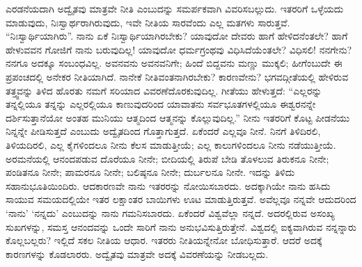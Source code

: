 ಎರಡನೆಯದಾಗಿ ಅದ್ವೈತವು ಮಾತ್ರವೇ ನೀತಿ ಎಂಬುದನ್ನು ಸಮರ್ಪಕವಾಗಿ ವಿವರಿಸಬಲ್ಲುದು. ಇತರರಿಗೆ ಒಳ್ಳೆಯದು ಮಾಡುವುದು, ನಿಃಸ್ವಾರ್ಥರಾಗಿರುವುದು, ಇವೇ ನೀತಿಯ ಸಾರವೆಂದು ಎಲ್ಲ ಮತಗಳು ಸಾರುತ್ತವೆ. “ನಿಃಸ್ವಾರ್ಥಿಯಾಗಿರು”. ನಾನು ಏಕೆ ನಿಃಸ್ವಾರ್ಥಿಯಾಗಿರಬೇಕು? ಯಾವುದೋ ದೇವರು ಹಾಗೆ ಹೇಳಿದನೆಂತಲೇ? ಹಾಗೆ ಹೇಳುವವನ ಗೋಜಿಗೆ ನಾನು ಬರುವುದಿಲ್ಲ! ಯಾವುದೋ ಧರ್ಮಗ್ರಂಥವು ವಿಧಿಸಿದೆಯೆಂತಲೇ? ವಿಧಿಸಲಿ! ನನಗೇನು? ನನಗೂ ಅದಕ್ಕೂ ಸಂಬಂಧವಿಲ್ಲ. ಅವನವನು ಅವನವನಿಗೇ; ಹಿಂದೆ ಬಿದ್ದವನು ಮಣ್ಣು ಮುಕ್ಕಲಿ; ಹೀಗೆಂಬುದೇ ಈ ಪ್ರಪಂಚದಲ್ಲಿ ಅನೇಕರ ನೀತಿಯಾಗಿದೆ. ನಾನೇಕೆ ನೀತಿವಂತನಾಗಿರಬೇಕು? ಕಾರಣವೇನು? ಭಗವದ್ಗೀತೆಯಲ್ಲಿ ಹೇಳಿರುವ ತತ್ತ್ವವನ್ನು ತಿಳಿದ ಹೊರತು ನಮಗೆ ಸರಿಯಾದ ವಿವರಣೆ\break ದೊರಕುವುದಿಲ್ಲ. ಗೀತೆಯು ಹೇಳುತ್ತದೆ: “ಎಲ್ಲರನ್ನು ತನ್ನಲ್ಲಿಯೂ ತನ್ನನ್ನು ಎಲ್ಲರಲ್ಲಿಯೂ ಕಾಣುವುದರಿಂದ ಯಾವಾತನು ಸರ್ವಭೂತಗಳಲ್ಲಿಯೂ ಈಶ್ವರನನ್ನೇ ದರ್ಶಿಸುತ್ತಾನೆಯೋ ಅಂತಹ ಮುನಿಯು ಆತ್ಮದಿಂದ ಆತ್ಮನನ್ನು ಕೊಲ್ಲುವುದಿಲ್ಲ.” ನೀನು ಇತರರಿಗೆ ಕೊಟ್ಟ ಪೀಡನೆಯು ನಿನ್ನನ್ನೇ ಪೀಡಿಸುತ್ತದೆ ಎಂಬುದು ಅದ್ವೈತದಿಂದ ಗೊತ್ತಾಗುತ್ತದೆ. ಏಕೆಂದರೆ ಎಲ್ಲವೂ ನೀನೆ. ನಿನಗೆ ತಿಳಿದಿರಲಿ, ತಿಳಿಯದಿರಲಿ, ಎಲ್ಲ ಕೈಗಳಿಂದಲೂ ನೀನು ಕೆಲಸ ಮಾಡುತ್ತೀಯೆ; ಎಲ್ಲ ಕಾಲುಗಳಿಂದಲೂ ನೀನು ನಡೆಯುತ್ತೀಯೆ. ಅರಮನೆಯಲ್ಲಿ ಆನಂದಪಡುವ ದೊರೆಯೂ ನೀನೇ; ಬೀದಿಯಲ್ಲಿ ತಿರುಪೆ ಬೇಡಿ ತೊಳಲುವ ತಿರುಕನೂ ನೀನೇ; ಪಂಡಿತನೂ ನೀನೇ; ಪಾಮರನೂ ನೀನೇ; ಬಲಿಷ್ಠನೂ ನೀನೇ; ದುರ್ಬಲನೂ ನೀನೇ. ಇದನ್ನು ತಿಳಿದು ಸಹಾನುಭೂತಿಯಿಂದಿರು. ಆದಕಾರಣವೇ ನಾನು ಇತರರನ್ನು ನೋಯಿಸಬಾರದು. ಅದಕ್ಕಾಗಿಯೇ ನಾನು ಹಸಿದು ಸಾಯುವ ಸಮಯದಲ್ಲಿಯೇ ಇತರ ಲಕ್ಷಾಂತರ ಬಾಯಿಗಳು ಊಟ ಮಾಡುತ್ತಿರುತ್ತವೆ. ಅವೆಲ್ಲವೂ ನನ್ನವೇ ಆದುದರಿಂದ ‘ನಾನು’ ‘ನನ್ನದು’ ಎಂಬುದನ್ನು ನಾನು ಗಮನಿಸಬಾರದು. ಏಕೆಂದರೆ ವಿಶ್ವವೆಲ್ಲಾ ನನ್ನದೆ. ಅದರಲ್ಲಿರುವ ಅಸಂಖ್ಯ ಸುಖಗಳನ್ನು, ಸಮಸ್ತ ಆನಂದವನ್ನು ಒಂದೇ ಸಾರಿಗೆ ನಾನು ಅನುಭವಿಸುತ್ತಿರುತ್ತೇನೆ. ವಿಶ್ವದಲ್ಲಿ ಐಕ್ಯವಾಗಿರುವ ನನ್ನನ್ನಾರು ಕೊಲ್ಲಬಲ್ಲರು? ಇಲ್ಲಿದೆ ಸಕಲ ನೀತಿಯ ಆಧಾರ. ಇತರರು ನೀತಿಯನ್ನೇನೋ ಬೋಧಿಸುತ್ತಾರೆ. ಆದರೆ ಅದಕ್ಕೆ ಕಾರಣಗಳನ್ನು ಕೊಡಲಾರರು. ಅದ್ವೈತವು ಮಾತ್ರವೇ ಅದಕ್ಕೆ ವಿವರಣೆಯನ್ನು ನೀಡಬಲ್ಲದು. 

